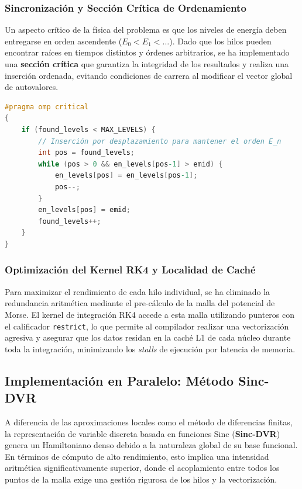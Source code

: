 \documentclass[11pt,fleqn]{article}
\begin{document}
\subsubsection{Sincronización y Sección Crítica de Ordenamiento}

Un aspecto crítico de la física del problema es que los niveles de energía deben entregarse en orden ascendente ($E_0 < E_1 < \dots$). Dado que los hilos pueden encontrar raíces en tiempos distintos y órdenes arbitrarios, se ha implementado una \textbf{sección crítica} que garantiza la integridad de los resultados y realiza una inserción ordenada, evitando condiciones de carrera al modificar el vector global de autovalores.

\begin{lstlisting}[language=C, caption=Sincronización de hilos para la preservación del orden físico]
#pragma omp critical
{
    if (found_levels < MAX_LEVELS) {
        // Inserción por desplazamiento para mantener el orden E_n
        int pos = found_levels;
        while (pos > 0 && en_levels[pos-1] > emid) {
            en_levels[pos] = en_levels[pos-1];
            pos--;
        }
        en_levels[pos] = emid;
        found_levels++;
    }
}
\end{lstlisting}

\subsubsection{Optimización del Kernel RK4 y Localidad de Caché}

Para maximizar el rendimiento de cada hilo individual, se ha eliminado la redundancia aritmética mediante el pre-cálculo de la malla del potencial de Morse. El kernel de integración RK4 accede a esta malla utilizando punteros con el calificador \texttt{restrict}, lo que permite al compilador realizar una vectorización agresiva y asegurar que los datos residan en la caché L1 de cada núcleo durante toda la integración, minimizando los \textit{stalls} de ejecución por latencia de memoria.


\subsection{Implementación en Paralelo: Método Sinc-DVR}

A diferencia de las aproximaciones locales como el método de diferencias finitas, la representación de variable discreta basada en funciones Sinc (\textbf{Sinc-DVR}) genera un Hamiltoniano denso debido a la naturaleza global de su base funcional. En términos de cómputo de alto rendimiento, esto implica una intensidad aritmética significativamente superior, donde el acoplamiento entre todos los puntos de la malla exige una gestión rigurosa de los hilos y la vectorización.
\end{document}

